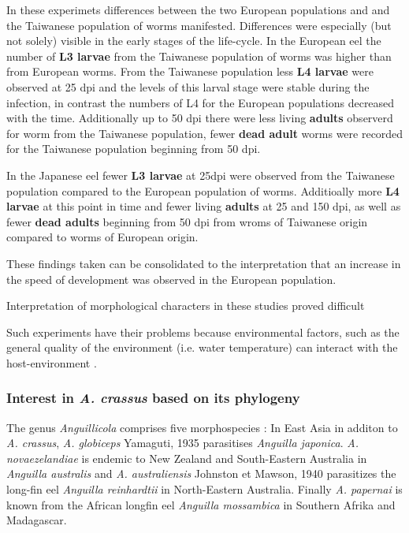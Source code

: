 

In these experimets differences between the two European populations
and and the Taiwanese population of worms manifested. Differences were
especially (but not solely) visible in the early stages of the
life-cycle. In the European eel the number of \textbf{L3 larvae} from
the Taiwanese population of worms was higher than from European
worms. From the Taiwanese population less \textbf{L4 larvae} were
observed at 25 dpi and the levels of this larval stage were stable
during the infection, in contrast the numbers of L4 for the European
populations decreased with the time. Additionally up to 50 dpi there
were less living \textbf{adults} observerd for worm from the Taiwanese
population, fewer \textbf{dead adult} worms were recorded for the
Taiwanese population beginning from 50 dpi.

In the Japanese eel fewer \textbf{L3 larvae} at 25dpi were observed
from the Taiwanese population compared to the European population of
worms. Additioally more \textbf{L4 larvae} at this point in time and
fewer living \textbf{adults} at 25 and 150 dpi, as well as fewer
\textbf{dead adults} beginning from 50 dpi from wroms of Taiwanese
origin compared to worms of European origin.

These findings taken can be consolidated to the interpretation that an
increase in the speed of development was observed in the European
population. 

Interpretation of morphological characters in these studies proved
difficult

Such experiments have their problems because environmental factors,
such as the general quality of the environment (i.e. water
temperature) can interact with the host-environment
\cite{kaltz_shykoff_rev}.


\subsubsection{Interest in \textit{A. crassus} based on its
    phylogeny}
\label{phyl-int}

The genus \textit{Anguillicola} comprises five morphospecies
\cite{taraschewski_revision_1988}: In East Asia in additon to
\textit{A. crassus}, \textit{A. globiceps} Yamaguti, 1935
\cite{yamaguti_globiceps} parasitises \textit{Anguilla
  japonica}. \textit{A. novaezelandiae} is endemic to New Zealand and
South-Eastern Australia in \textit{Anguilla australis} and
\textit{A. australiensis} Johnston et Mawson, 1940
\cite{johnston1940some} parasitizes the long-fin eel \textit{Anguilla
  reinhardtii} in North-Eastern Australia. Finally
\textit{A. papernai} is known from the African longfin eel
\textit{Anguilla mossambica} in Southern Afrika and Madagascar.

